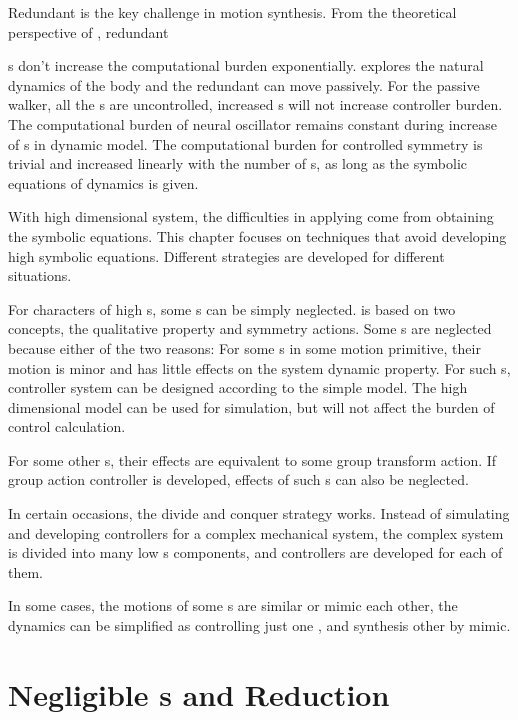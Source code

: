 Redundant {\dof} is the key challenge in motion synthesis.
From the theoretical perspective of \moit, redundant {\dof s don't increase the computational burden exponentially.
\moit explores the natural dynamics of the body and the redundant {\dof} can move passively.
For the passive walker, all the \dof s are uncontrolled, increased {\dof} s will not increase controller burden.
The computational burden of neural oscillator remains constant during increase of {\dof} s in dynamic model.
The computational burden for controlled symmetry is trivial and increased linearly with the number of {\dof} s, as long as the symbolic equations of dynamics is given.

With high dimensional system,  the difficulties in applying \moit  come from  obtaining the symbolic equations.
This chapter focuses on techniques that avoid developing high \dof symbolic equations.
Different strategies are developed for different situations.

\begin{itemize}
For characters of high {\dof}s, some {\dof}s can be simply neglected.
\moit is based on two concepts, the qualitative property and symmetry actions.
Some \dof s are neglected because either of the two reasons:
For some {\dof}s in some motion primitive, their motion is minor and has little effects on the system dynamic property.
For such {\dof}s, controller system can be designed according to the simple model. 
The high dimensional model can be used for simulation, but will not affect the burden of control calculation.

For some other {\dof}s, their effects are equivalent to some group transform action.
If group action controller is developed, effects of such {\dof}s can also be neglected.

In certain occasions, the divide and conquer strategy works.
Instead of simulating and developing controllers for a complex mechanical system, the complex system is divided into many  low {\dof}s components, and controllers are developed for each of them.

In some cases, the motions of some {\dof}s are similar or mimic each other, the dynamics can be simplified as controlling just one {\dof}, and synthesis other {\dof} by mimic.
\end{itemize} 

\section{Negligible {\dof}s and Reduction}
}
